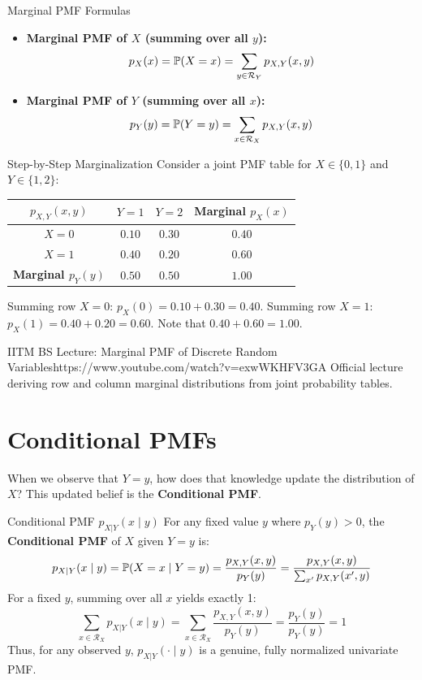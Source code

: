 \begin{formulabox}{Marginal PMF Formulas}
\begin{itemize}
    \item \textbf{Marginal PMF of $X$ (summing over all $y$):}
    $$p_X(x) = \P(X = x) = \sum_{y \in \mathcal{R}_Y} p_{X,Y}(x, y)$$
    \item \textbf{Marginal PMF of $Y$ (summing over all $x$):}
    $$p_Y(y) = \P(Y = y) = \sum_{x \in \mathcal{R}_X} p_{X,Y}(x, y)$$
\end{itemize}
\end{formulabox}

\begin{examplebox}{Step-by-Step Marginalization}
Consider a joint PMF table for $X \in \{0, 1\}$ and $Y \in \{1, 2\}$:
\begin{center}
\begin{tabular}{c|cc|c}
$p_{X,Y}(x, y)$ & $Y = 1$ & $Y = 2$ & \textbf{Marginal $p_X(x)$} \\
\hline
$X = 0$ & $0.10$ & $0.30$ & $\mathbf{0.40}$ \\
$X = 1$ & $0.40$ & $0.20$ & $\mathbf{0.60}$ \\
\hline
\textbf{Marginal $p_Y(y)$} & $\mathbf{0.50}$ & $\mathbf{0.50}$ & $\mathbf{1.00}$ \\
\end{tabular}
\end{center}
Summing row $X=0$: $p_X(0) = 0.10 + 0.30 = 0.40$. Summing row $X=1$: $p_X(1) = 0.40 + 0.20 = 0.60$. Note that $0.40 + 0.60 = 1.00$.
\end{examplebox}

\begin{videocard}{IITM BS Lecture: Marginal PMF of Discrete Random Variables}{https://www.youtube.com/watch?v=exwWKHFV3GA}
Official lecture deriving row and column marginal distributions from joint probability tables.
\end{videocard}

\section{Conditional PMFs}

When we observe that $Y = y$, how does that knowledge update the distribution of $X$? This updated belief is the \textbf{Conditional PMF}.

\begin{definitionbox}{Conditional PMF $p_{X|Y}(x \mid y)$}
For any fixed value $y$ where $p_Y(y) > 0$, the \textbf{Conditional PMF} of $X$ given $Y = y$ is:
$$p_{X|Y}(x \mid y) = \P(X = x \mid Y = y) = \frac{p_{X,Y}(x, y)}{p_Y(y)} = \frac{p_{X,Y}(x, y)}{\sum_{x'} p_{X,Y}(x', y)}$$
For a fixed $y$, summing over all $x$ yields exactly 1:
$$\sum_{x \in \mathcal{R}_X} p_{X|Y}(x \mid y) = \sum_{x \in \mathcal{R}_X} \frac{p_{X,Y}(x, y)}{p_Y(y)} = \frac{p_Y(y)}{p_Y(y)} = 1$$
Thus, for any observed $y$, $p_{X|Y}(\cdot \mid y)$ is a genuine, fully normalized univariate PMF.
\end{definitionbox}

